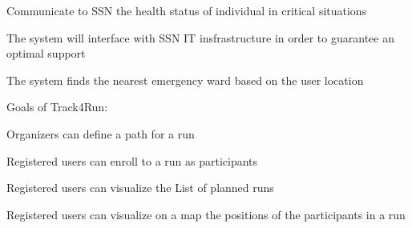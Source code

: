 \begin{goalList}
\begin{enumerate}[label={[}G 2.\arabic*{]}]
\item \label{goal:sos1}Communicate to SSN the health status of individual in critical situations
\item \label{goal:sos2}
The system will interface with SSN IT insfrastructure in order to guarantee an optimal support
\item \label{goal:sos3}The system finds the nearest emergency ward based on the user location

\end{enumerate}

Goals of Track4Run:
\begin{enumerate}[label={[}G 3.\arabic*{]}]

\item \label{goal:run1}
Organizers can define a path for a run
\item \label{goal:run2}Registered users can enroll to a run as participants
\item \label{goal:run3}Registered users can visualize the List of planned runs
\item \label{goal:run4}Registered users can visualize on a map the positions of the participants
in a run


\end{enumerate}
\end{goalList}

